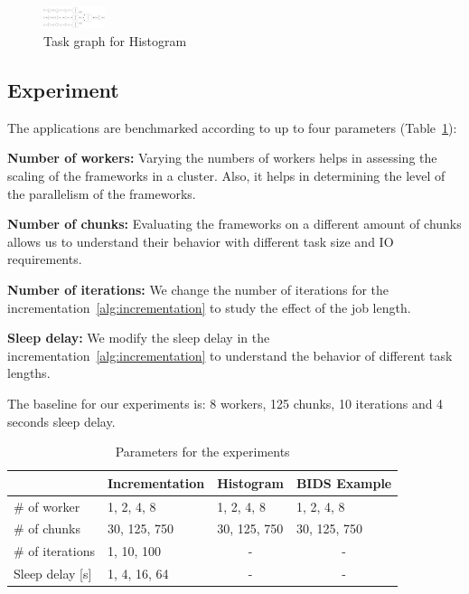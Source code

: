 \documentclass[conference]{IEEEtran}
\begin{document}
\begin{figure}[!t]
    \centering
    \includegraphics[width=0.16\textwidth, angle=-90]{images/histogram-task-graph.png}
    \caption{Task graph for Histogram}\label{fig:tg-histo}
\end{figure}

\subsection{Experiment}
The applications are benchmarked according to up to four parameters
(Table~\ref{tab:param}):

\textbf{Number of workers:} Varying the numbers of workers helps in assessing the
scaling of the frameworks in a cluster. Also, it helps in determining the level of
the parallelism of the frameworks.

\textbf{Number of chunks:} Evaluating the frameworks on a different amount of chunks
allows us to understand their behavior with different task size and IO requirements.

\textbf{Number of iterations:} We change the number of iterations for the
incrementation~\ref{alg:incrementation} to study the effect of the job length.

\textbf{Sleep delay:} We modify the sleep delay in the
incrementation~\ref{alg:incrementation} to understand the behavior of different task
lengths.

The baseline for our experiments is: 8 workers, 125 chunks, 10 iterations and 4
seconds sleep delay.


\begin{table}[!t]
    \renewcommand{\arraystretch}{1.3}
    \caption{Parameters for the experiments}\label{tab:param}
    \centering
    \begin{tabular*}{\columnwidth}{llll}
    \hline
                        & Incrementation & Histogram             & BIDS Example          \\ \hline
    \# of worker        & 1, 2, 4, 8     & 1, 2, 4, 8            & 1, 2, 4, 8            \\
    \# of chunks        & 30, 125, 750   & 30, 125, 750          & 30, 125, 750          \\
    \# of iterations    & 1, 10, 100     & \multicolumn{1}{c}{-} & \multicolumn{1}{c}{-} \\
    Sleep delay {[}s{]} & 1, 4, 16, 64   & \multicolumn{1}{c}{-} & \multicolumn{1}{c}{-} \\ \hline
    \end{tabular*}
    \end{table}
\end{document}

